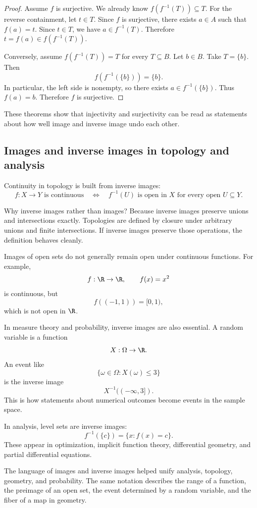 \begin{proof}
Assume $f$ is surjective. We already know $f(f^{-1}(T))\subseteq T$. For the reverse containment, let $t\in T$. Since $f$ is surjective, there exists $a\in A$ such that $f(a)=t$. Since $t\in T$, we have $a\in f^{-1}(T)$. Therefore $t=f(a)\in f(f^{-1}(T))$.

Conversely, assume $f(f^{-1}(T))=T$ for every $T\subseteq B$. Let $b\in B$. Take $T=\{b\}$. Then
\[
f(f^{-1}(\{b\}))=\{b\}.
\]
In particular, the left side is nonempty, so there exists $a\in f^{-1}(\{b\})$. Thus $f(a)=b$. Therefore $f$ is surjective.
\end{proof}

These theorems show that injectivity and surjectivity can be read as statements about how well image and inverse image undo each other.

\subsection{Images and inverse images in topology and analysis}

Continuity in topology is built from inverse images:
\[
f:X\to Y\text{ is continuous}\quad\Longleftrightarrow\quad f^{-1}(U)\text{ is open in }X\text{ for every open }U\subseteq Y.
\]

Why inverse images rather than images? Because inverse images preserve unions and intersections exactly. Topologies are defined by closure under arbitrary unions and finite intersections. If inverse images preserve those operations, the definition behaves cleanly.

Images of open sets do not generally remain open under continuous functions. For example,
\[
f:\R\to\R,\qquad f(x)=x^2
\]
is continuous, but
\[
f((-1,1))=[0,1),
\]
which is not open in $\R$.

In measure theory and probability, inverse images are also essential. A random variable is a function
\[
X:\Omega\to\R.
\]
An event like
\[
\{\omega\in\Omega:X(\omega)\leq 3\}
\]
is the inverse image
\[
X^{-1}((-\infty,3]).
\]
This is how statements about numerical outcomes become events in the sample space.

In analysis, level sets are inverse images:
\[
f^{-1}(\{c\})=\{x:f(x)=c\}.
\]
These appear in optimization, implicit function theory, differential geometry, and partial differential equations.

\begin{historybox}
The language of images and inverse images helped unify analysis, topology, geometry, and probability. The same notation describes the range of a function, the preimage of an open set, the event determined by a random variable, and the fiber of a map in geometry.
\end{historybox}

